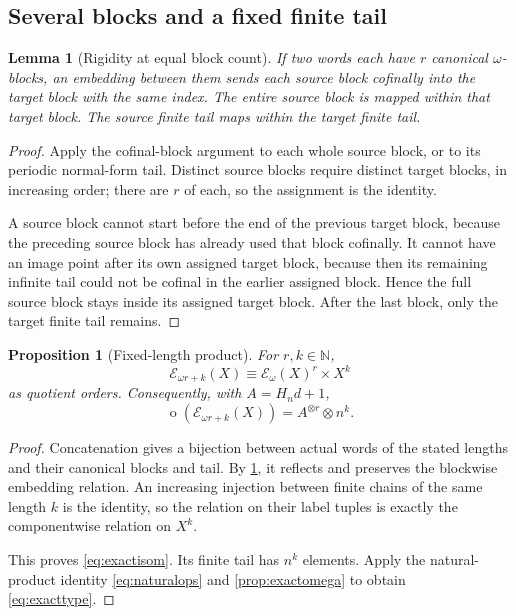 \documentclass[11pt]{article}
\numberwithin{equation}{section}
\theoremstyle{plain}
\newtheorem{lemma}[lemma]{Lemma}
\newtheorem{proposition}[proposition]{Proposition}
\theoremstyle{definition}
\theoremstyle{remark}
\newcommand{\ot}{\operatorname{o}}
\newcommand{\E}{\mathcal E}
\newcommand{\HH}{H}
\newcommand{\N}{\mathbb N}
\begin{document}
\subsection{Several blocks and a fixed finite tail}

\begin{lemma}[Rigidity at equal block count]\label{lem:equalblocks}
If two words each have $r$ canonical $\omega$-blocks, an embedding between them sends each source block cofinally into the target block with the same index. The entire source block is mapped within that target block. The source finite tail maps within the target finite tail.
\end{lemma}
\begin{proof}
Apply the cofinal-block argument to each whole source block, or to its periodic normal-form tail. Distinct source blocks require distinct target blocks, in increasing order; there are $r$ of each, so the assignment is the identity.

A source block cannot start before the end of the previous target block, because the preceding source block has already used that block cofinally. It cannot have an image point after its own assigned target block, because then its remaining infinite tail could not be cofinal in the earlier assigned block. Hence the full source block stays inside its assigned target block. After the last block, only the target finite tail remains.
\end{proof}

\begin{proposition}[Fixed-length product]\label{prop:exactproduct}
For $r,k\in\N$,
\begin{equation}\label{eq:exactisom}
 \E_{\omega r+k}(X)\equiv\E_\omega(X)^r\times X^k
\end{equation}
as quotient orders. Consequently, with $A=\HH_n d+1$,
\begin{equation}\label{eq:exacttype}
 \ot(\E_{\omega r+k}(X))=A^{\otimes r}\otimes n^k.
\end{equation}
\end{proposition}
\begin{proof}
Concatenation gives a bijection between actual words of the stated lengths and their canonical blocks and tail. By \cref{lem:equalblocks}, it reflects and preserves the blockwise embedding relation. An increasing injection between finite chains of the same length $k$ is the identity, so the relation on their label tuples is exactly the componentwise relation on $X^k$.

This proves \eqref{eq:exactisom}. Its finite tail has $n^k$ elements. Apply the natural-product identity \eqref{eq:naturalops} and \cref{prop:exactomega} to obtain \eqref{eq:exacttype}.
\end{proof}
\end{document}
